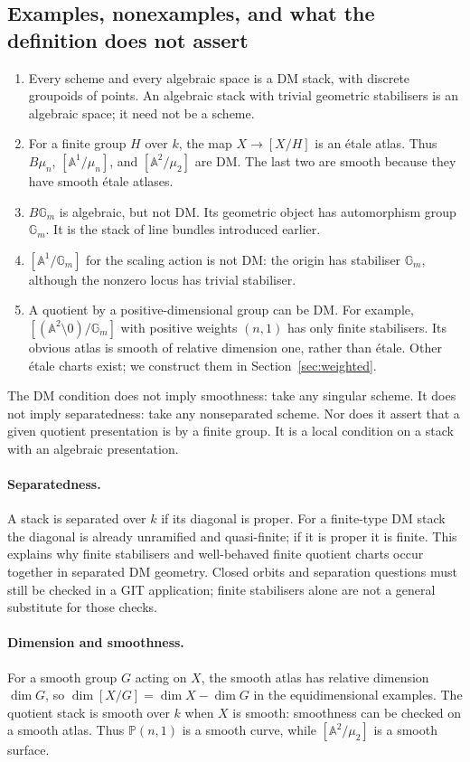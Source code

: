 \documentclass[11pt,a4paper]{article}
\numberwithin{equation}{section}
\theoremstyle{definition}
\newcommand{\A}{\mathbb A}
\newcommand{\PP}{\mathbb P}
\newcommand{\Gm}{\mathbb G_m}
\begin{document}
\subsection{Examples, nonexamples, and what the definition does not assert}
\begin{enumerate}
\item Every scheme and every algebraic space is a DM stack, with discrete
groupoids of points. An algebraic stack with trivial geometric stabilisers is
an algebraic space; it need not be a scheme.
\item For a finite group $H$ over $k$, the map $X\to[X/H]$ is an étale atlas.
Thus $B\mu_n$, $[\A^1/\mu_n]$, and $[\A^2/\mu_2]$ are DM. The last two
are smooth because they have smooth étale atlases.
\item $B\Gm$ is algebraic, but not DM. Its geometric object has automorphism
group $\Gm$. It is the stack of line bundles introduced earlier.
\item $[\A^1/\Gm]$ for the scaling action is not DM: the origin has stabiliser
$\Gm$, although the nonzero locus has trivial stabiliser.
\item A quotient by a positive-dimensional group can be DM. For example,
$[(\A^2\setminus0)/\Gm]$ with positive weights $(n,1)$ has only finite
stabilisers. Its obvious atlas is smooth of relative dimension one, rather
than étale. Other étale charts exist; we construct them in
Section~\ref{sec:weighted}.
\end{enumerate}

The DM condition does not imply smoothness: take any singular scheme. It
does not imply separatedness: take any nonseparated scheme. Nor does it assert
that a given quotient presentation is by a finite group. It is a local
condition on a stack with an algebraic presentation.

\paragraph{Separatedness.}
A stack is separated over $k$ if its diagonal is proper. For a finite-type
DM stack the diagonal is already unramified and quasi-finite; if it is proper
it is finite. This explains why finite stabilisers and well-behaved finite
quotient charts occur together in separated DM geometry. Closed orbits and
separation questions must still be checked in a GIT application; finite
stabilisers alone are not a general substitute for those checks.

\paragraph{Dimension and smoothness.}
For a smooth group $G$ acting on $X$, the smooth atlas has relative dimension
$\dim G$, so $\dim[X/G]=\dim X-\dim G$ in the equidimensional examples.
The quotient stack is smooth over $k$ when $X$ is smooth: smoothness can be
checked on a smooth atlas. Thus $\PP(n,1)$ is a smooth curve, while
$[\A^2/\mu_2]$ is a smooth surface.
\end{document}
